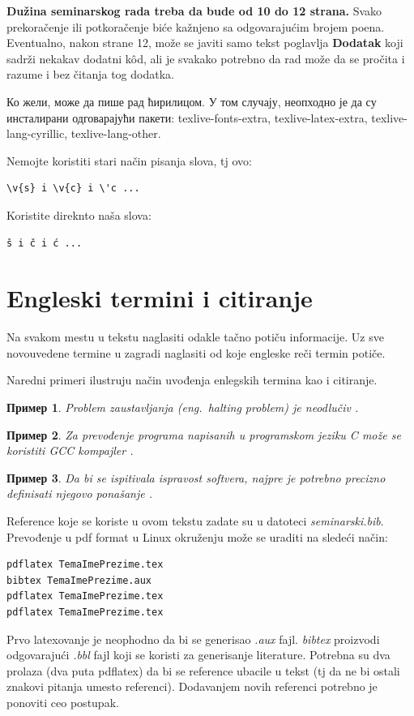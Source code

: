 \documentclass[a4paper]{article}
\newtheorem{primer}{Пример}[section] %
\begin{document}
\textbf{Dužina seminarskog rada treba da bude od 10 do 12 strana.} Svako prekoračenje ili potkoračenje biće kažnjeno sa odgovarajućim brojem poena. Eventualno, nakon strane 12, može se javiti samo tekst poglavlja \textbf{Dodatak} koji sadrži nekakav dodatni k\^{o}d, ali je svakako potrebno da rad može da se pročita i razume i bez čitanja tog dodatka. 

Ко жели, може да пише рад ћирилицом. У том случају, неопходно је да су инсталирани одговарајући пакети: texlive-fonts-extra, texlive-latex-extra, texlive-lang-cyrillic, texlive-lang-other. 

Nemojte koristiti stari način pisanja slova, tj ovo:
\begin{verbatim}
\v{s} i \v{c} i \'c ...
\end{verbatim}
Koristite direknto naša slova:	
\begin{verbatim}
š i č i ć ... 
\end{verbatim}


\section{Engleski termini i citiranje}	
\label{sec:termini_i_citiranje}

Na svakom mestu u tekstu naglasiti odakle tačno potiču informacije. Uz sve novouvedene termine u zagradi naglasiti od koje engleske reči termin potiče. 

Naredni primeri ilustruju način uvođenja enlegskih termina kao i citiranje.

\begin{primer}
Problem zaustavljanja (eng.~{\em halting problem}) je neodlučiv \cite{haltingproblem}.
\end{primer}

\begin{primer}
Za prevođenje programa napisanih u programskom jeziku C može se koristiti GCC kompajler \cite{gcc}.
\end{primer}

\begin{primer}
 Da bi se ispitivala ispravost softvera, najpre je potrebno precizno definisati njegovo ponašanje \cite{laski2009software}. 
\end{primer}

Reference koje se koriste u ovom tekstu zadate su u datoteci {\em seminarski.bib}. Prevođenje u pdf format u Linux okruženju može se uraditi na sledeći način:
\begin{verbatim}
pdflatex TemaImePrezime.tex 
bibtex TemaImePrezime.aux 
pdflatex TemaImePrezime.tex 
pdflatex TemaImePrezime.tex 
\end{verbatim}
Prvo latexovanje je neophodno da bi se generisao {\em .aux} fajl. {\em bibtex} proizvodi odgovarajući {\em .bbl} fajl koji se koristi za generisanje literature. 
Potrebna su dva prolaza (dva puta pdflatex) da bi se reference ubacile u tekst (tj da ne bi ostali znakovi pitanja umesto referenci). Dodavanjem novih referenci potrebno je ponoviti ceo postupak.  
\end{document}
